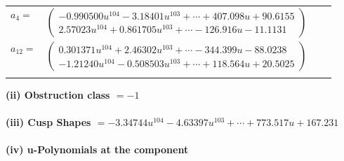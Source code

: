 \documentclass[1p]{elsarticle_modified}
\theoremstyle{definition}
\begin{document}
\begin{tabular}{m{7pt} m{180pt} m{7pt} m{180pt} }
\flushright $a_{4}=$&$\begin{pmatrix}-0.990500 u^{104}-3.18401 u^{103}+\cdots+407.098 u+90.6155\\2.57023 u^{104}+0.861705 u^{103}+\cdots-126.916 u-11.1131\end{pmatrix}$ \\
\flushright $a_{12}=$&$\begin{pmatrix}0.301371 u^{104}+2.46302 u^{103}+\cdots-344.399 u-88.0238\\-1.21240 u^{104}-0.508503 u^{103}+\cdots+118.564 u+20.5025\end{pmatrix}$\\&\end{tabular}
\flushleft \textbf{(ii) Obstruction class $= -1$}\\~\\
\flushleft \textbf{(iii) Cusp Shapes $= -3.34744 u^{104}-4.63397 u^{103}+\cdots+773.517 u+167.231$}\\~\\
\newpage\renewcommand{\arraystretch}{1}
\flushleft \textbf{(iv) u-Polynomials at the component}\newline \\
\end{document}

